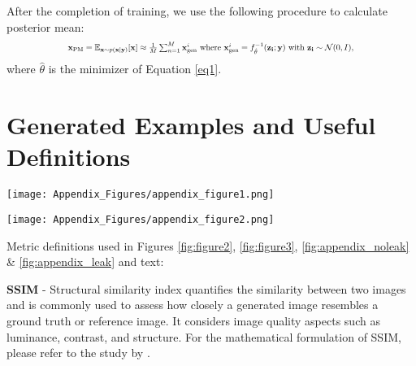 \documentclass{article}
\begin{document}
\begin{appendices}
After the completion of training, we use the following procedure to calculate posterior mean:
%
\begin{equation}
\resizebox{0.73\hsize}{!}{%
    $\mathbf{x}_{\text{PM}} = \mathbb{E}_{\mathbf{x} \sim p(\mathbf{x}|\mathbf{y})} [ \mathbf{x} ]
    \approx 
    \frac{1}{M}  \sum^{M}_{n=1}\mathbf{x}_{\text{gen}}^{i} \text{ where } \mathbf{x}_{\text{gen}}^{i} = f_{\hat{\theta}}^{-1}(\mathbf{z_i};\mathbf{y}) \text{ with } \mathbf{z_i} \sim \mathcal{N}(0,I),$%
    }
\end{equation} \label{posteriormean}
%
where $\hat{\theta}$ is the minimizer of Equation \ref{eq1}.


\section{Generated Examples and Useful Definitions} \label{examples}


\begin{figure*}[h]
\centering
\texttt{[image: Appendix\_Figures/appendix\_figure1.png]}
\caption{\small{Two distinct examples for no-leakage scenario. In both cases, the network can generate high-fidelity saturation images with posterior mean SSIM of 0.97. Relatively larger uncertainty values are concentrated around the boundary of CO$_{2}$ plumes.}}
\label{fig:appendix_noleak}
\end{figure*}

\begin{figure*}[t]
\centering
\texttt{[image: Appendix\_Figures/appendix\_figure2.png]}
\caption{\small{The corresponding leakage scenario for previous two examples. In both instances, the leakage posterior means have SSIM of 0.97. Relatively larger uncertainty values are concentrated within the area of the CO$_2$ leakage, particularly along the canal (fractured seal area) and the edges of the plume. }}
\label{fig:appendix_leak}
\end{figure*}

Metric definitions used in Figures \ref{fig:figure2}, \ref{fig:figure3}, \ref{fig:appendix_noleak} \& \ref{fig:appendix_leak} and text:

\textbf{SSIM} - Structural similarity index quantifies the similarity between two images and is commonly used to assess how closely a generated image resembles a ground truth or reference image. It considers image quality aspects such as luminance, contrast, and structure. For the mathematical formulation of SSIM, please refer to the study by \cite{1284395}.


\end{appendices}
\end{document}
